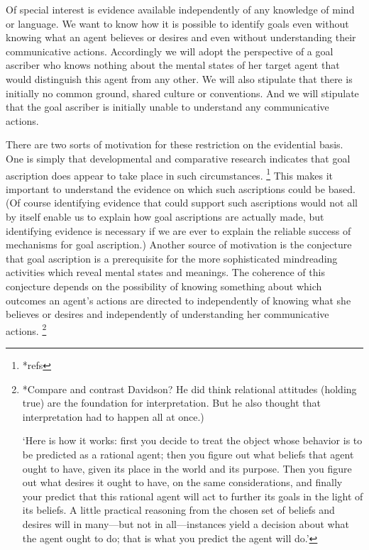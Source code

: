 \documentclass[14pt,a4paper]{extarticle}
\begin{document}
Of special interest is evidence available independently of any knowledge of mind or language.
We want to know how it is possible to identify goals even without knowing what an agent believes or desires and even without understanding their communicative actions.
Accordingly we will adopt the perspective of a goal ascriber who knows nothing about the mental states of her target agent that would distinguish this agent from any other.
We will also stipulate that there is initially no common ground, shared culture or conventions.
And we will stipulate that the goal ascriber is initially unable to understand any communicative actions.

There are two sorts of motivation for these restriction on the evidential basis.
One is simply that developmental and comparative research indicates that goal ascription does appear to take place  in such circumstances.%
\footnote{
*refs
}
This makes it important to understand the evidence on which such ascriptions could be based.
(Of course 
identifying evidence that could support such ascriptions 
would not all by itself enable us to explain how goal ascriptions are actually made, 
but identifying evidence is necessary if we are ever to explain the reliable success of mechanisms for goal ascription.)
Another source of motivation is the conjecture that goal ascription is a prerequisite for the more sophisticated mindreading activities which reveal mental states and meanings.
The coherence of this conjecture depends on the possibility of knowing something about which outcomes an agent's actions are directed to independently of knowing what she believes or desires and independently of understanding her communicative actions.%
\footnote{
*Compare and contrast Davidson?
He did think relational attitudes (holding true) are the foundation for interpretation.
But he also thought that interpretation had to happen all at once.)

\citet[p.\ 17]{Dennett:1987sf} `Here is how it works: first you decide to treat the object whose behavior is to be predicted as a rational agent; then you figure out what beliefs that agent ought to have, given its place in the world and its purpose.   Then you figure out what desires it ought to have, on the same considerations, and finally your predict that this rational agent will act to further its goals in the light of its beliefs.  A little practical reasoning from the chosen set of beliefs and desires will in many—but not in all—instances yield a decision about what the agent ought to do; that is what you predict the agent will do.'
}
\end{document}
